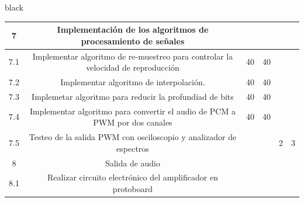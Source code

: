 \documentclass[11pt]{charter}
\begin{document}
\begin{consigna}{black}
\begin{table}[]
\begin{tabular}{|c|c|c|c|c|c|}
\rowcolor[HTML]{CBCEFB} 
7                                                                                              & Implementación de los algoritmos de procesamiento de señales                       &    &              &              &                                                                     \\ \hline
7.1                                                                                            & Implementar algoritmo de re-muestreo para controlar la velocidad de reproducción   & 40 & 40           &              &                                                                     \\ \hline
7.2                                                                                            & Implementar algoritmo de interpolación.                                            & 40 & 40           &              &                                                                     \\ \hline
7.3                                                                                            & Implemetar algoritmo para reducir la profundiad de bits                            & 40 & 40           &              &                                                                     \\ \hline
7.4                                                                                            & Implementar algoritmo para convertir el audio de PCM a PWM por dos canales         & 40 & 40           &              &                                                                     \\ \hline
7.5                                                                                            & Testeo de la salida PWM con osciloscopio y analizador de espectros                 &    &              & 2            & 3                                                                   \\ \hline
\rowcolor[HTML]{CBCEFB} 
8                                                                                              & Salida de audio                                                                    &    &              &              &                                                                     \\ \hline
8.1                                                                                            & Realizar circuito electrónico del amplificador en protoboard                       &    &              &              &                                                                     \\ \hline

\end{tabular}
\end{table}
\end{consigna}
\end{document}
